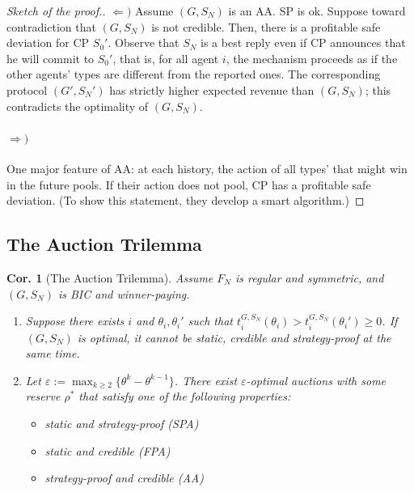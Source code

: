 \documentclass[11pt,a4paper,dvipdfmx]{article}
\theoremstyle{plain}
\newtheorem{cor}{Cor.}[section]
\renewcommand{\epsilon}{\varepsilon}
\newcommand{\1}{\mathbbm{1}}
\begin{document}
\begin{proof}[Sketch of the proof.]
	\textbf{ $\Leftarrow)$}
	Assume $(G, S_N)$ is an AA. SP is ok. Suppose toward contradiction that $(G, S_N)$ is not credible. Then, there is a profitable safe deviation for CP $S_0'$. Observe that $S_N$ is a best reply even if CP announces that he will commit to $S_0'$, that is, for all agent $i$, the mechanism proceeds as if the other agents' types are different from the reported ones. The corresponding protocol $(G', S_N')$ has strictly higher expected revenue than $(G, S_N)$; this contradicts the optimality of $(G, S_N)$.
	
	\paragraph{$\Rightarrow)$}
	One major feature of AA: at each history, the action of all types' that might win in the future pools. If their action does not pool, CP has a profitable safe deviation. (To show this statement, they develop a smart algorithm.)
\end{proof}

\subsection{The Auction Trilemma}
\begin{screen}
\begin{cor}[The Auction Trilemma] \label{trilemma}
Assume $F_N$ is regular and symmetric, and $(G, S_N)$ is BIC and winner-paying.
	\begin{enumerate}
		\item Suppose there exists $i$ and $\theta_i, \theta_i'$ such that $t_i^{G, S_N}(\theta_i) > t_i^{G, S_N}(\theta_i') \geq 0$. If $(G, S_N)$ is optimal, it cannot be static, credible and strategy-proof at the same time.
		\item Let $\epsilon := \max_{k \geq 2} \{\theta^k - \theta^{k-1}\}$. There exist $\epsilon$-optimal auctions with some reserve $\rho^*$ that satisfy one of the following properties:
		\begin{itemize}
			\item static and strategy-proof (SPA)
			\item static and credible (FPA)
			\item strategy-proof and credible (AA)
		\end{itemize}
	\end{enumerate}
\end{cor}
\end{screen}
\end{document}
